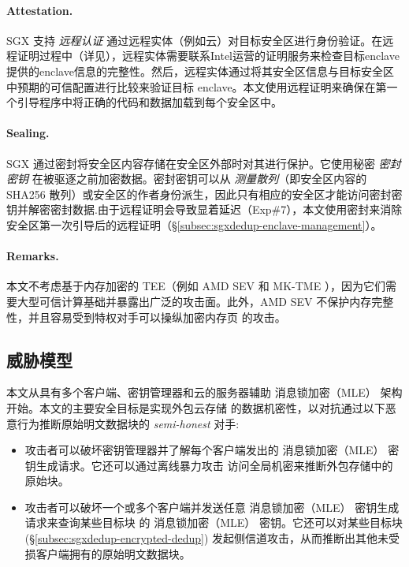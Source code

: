 \paragraph*{Attestation.} SGX 支持 \textit{ 远程认证} 通过远程实体（例如云）对目标安全区进行身份验证。在远程证明过程中（详见\cite{sgx}），远程实体需要联系Intel运营的证明服务来检查目标enclave提供的enclave信息的完整性。然后，远程实体通过将其安全区信息与目标安全区中预期的可信配置进行比较来验证目标 enclave。本文使用远程证明来确保在第一个引导程序中将正确的代码和数据加载到每个安全区中。

\paragraph*{Sealing.} SGX 通过密封将安全区内容存储在安全区外部时对其进行保护。它使用秘密 \textit{ 密封密钥} 在被驱逐之前加密数据。密封密钥可以从 \textit{ 测量散列}（即安全区内容的 SHA256 散列）或安全区的作者身份派生，因此只有相应的安全区才能访问密封密钥并解密密封数据.由于远程证明会导致显着延迟（Exp\#7），本文使用密封来消除安全区第一次引导后的远程证明（\S\ref{subsec:sgxdedup-enclave-management}）。

\paragraph*{Remarks.} 本文不考虑基于内存加密的 TEE（例如 AMD SEV \cite{AMDSEV} 和 MK-TME \cite{Mktem}），因为它们需要大型可信计算基础并暴露出广泛的攻击面\cite{mofrad18}。此外，AMD SEV \cite{AMDSEV} 不保护内存完整性，并且容易受到特权对手可以操纵加密内存页 \cite{mofrad18} 的攻击。

\subsection{威胁模型}
\label{subsec:sgxdedup-threat}

 本文从具有多个客户端、密钥管理器和云的服务器辅助 消息锁加密（MLE） 架构 \cite{bellare2013DupLESS} 开始。本文的主要安全目标是实现外包云存储 \cite{bellare2013DupLESS} 的数据机密性，以对抗通过以下恶意行为推断原始明文数据块的 \textit{ semi-honest} 对手:

\begin{itemize}[leftmargin=*]
\item 攻击者可以破坏密钥管理器并了解每个客户端发出的 消息锁加密（MLE） 密钥生成请求。它还可以通过离线暴力攻击 \cite{bellare2013DupLESS} 访问全局机密来推断外包存储中的原始块。
    \item 攻击者可以破坏一个或多个客户端并发送任意 消息锁加密（MLE） 密钥生成请求来查询某些目标块 \cite{bellare2013DupLESS} 的 消息锁加密（MLE） 密钥。它还可以对某些目标块 \cite{harnik10} (\S\ref{subsec:sgxdedup-encrypted-dedup}) 发起侧信道攻击，从而推断出其他未受损客户端拥有的原始明文数据块。
\end{itemize}

